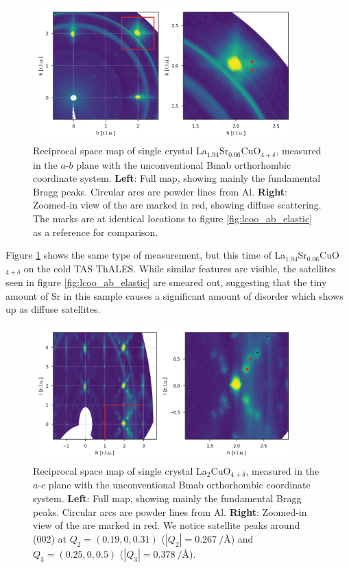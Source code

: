 \begin{figure}
    \centering
    \includegraphics[width=0.9\textwidth]{fig/pdf/lscoo_ab_elastic.png}
    \caption{Reciprocal space map of single crystal La$_{1.94}$Sr$_{0.06}$CuO$_{4+\delta}$, measured in the $a$-$b$ plane with the unconventional Bmab orthorhombic coordinate system. \textbf{Left}: Full map, showing mainly the fundamental Bragg peaks. Circular arcs are powder lines from Al. \textbf{Right}: Zoomed-in view of the are marked in red, showing diffuse scattering. The marks are at identical locations to figure \ref{fig:lcoo_ab_elastic} as a reference for comparison.}
    \label{fig:lscoo_ab_elastic}
\end{figure}

Figure \ref{fig:lscoo_ab_elastic} shows the same type of measurement, but this time of La$_{1.94}$Sr$_{0.06}$CuO$_{4+\delta}$ on the cold TAS ThALES. While similar features are visible, the satellites seen in figure \ref{fig:lcoo_ab_elastic} are smeared out, suggesting that the tiny amount of Sr in this sample causes a significant amount of disorder which shows up as diffuse satellites.

\begin{figure}
    \centering
    \includegraphics[width=0.9\textwidth]{fig/pdf/lscoo_ac_elastic.png}
    \caption{Reciprocal space map of single crystal La$_2$CuO$_{4+\delta}$, measured in the $a$-$c$ plane with the unconventional Bmab orthorhombic coordinate system. \textbf{Left}: Full map, showing mainly the fundamental Bragg peaks. Circular arcs are powder lines from Al. \textbf{Right}: Zoomed-in view of the are marked in red. We notice satellite peaks around (002) at $Q_2=(0.19,0,0.31)$ ($|Q_2| = \SI{0.267}{\per\angstrom}$) and $Q_3=(0.25,0,0.5)$ ($|Q_3| = \SI{0.378}{\per\angstrom}$).}
    \label{fig:lscoo_ac_elastic}
\end{figure}

